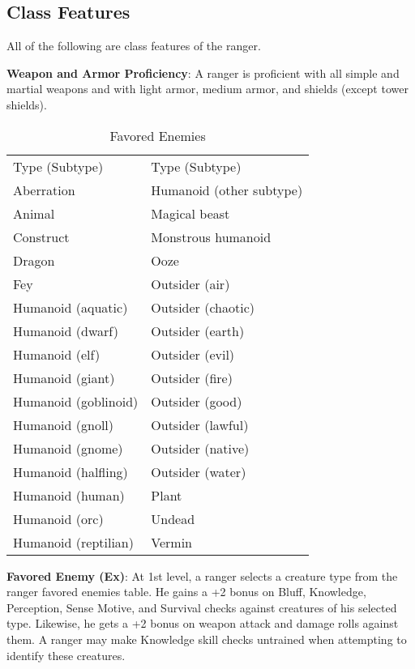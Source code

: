 				
\subsection{Class Features}

				
All of the following are class features of the ranger.
				
\textbf{Weapon and Armor Proficiency}: A ranger is proficient with all simple and martial weapons and with light armor, medium armor, and shields (except tower shields).
\begin{table}[]
\sffamily
\caption{Favored Enemies}
\begin{tabular}{ll}
Type (Subtype)       & Type (Subtype)           \\
Aberration           & Humanoid (other subtype) \\
Animal               & Magical beast            \\
Construct            & Monstrous humanoid       \\
Dragon               & Ooze                     \\
Fey                  & Outsider (air)           \\
Humanoid (aquatic)   & Outsider (chaotic)       \\
Humanoid (dwarf)     & Outsider (earth)         \\
Humanoid (elf)       & Outsider (evil)          \\
Humanoid (giant)     & Outsider (fire)          \\
Humanoid (goblinoid) & Outsider (good)          \\
Humanoid (gnoll)     & Outsider (lawful)        \\
Humanoid (gnome)     & Outsider (native)        \\
Humanoid (halfling)  & Outsider (water)         \\
Humanoid (human)     & Plant                    \\
Humanoid (orc)       & Undead                   \\
Humanoid (reptilian) & Vermin                  
\end{tabular}
\end{table}
\textbf{Favored Enemy (Ex)}: At 1st level, a ranger selects a creature type from the ranger favored enemies table. He gains a +2 bonus on Bluff, Knowledge, Perception, Sense Motive, and Survival checks against creatures of his selected type. Likewise, he gets a +2 bonus on weapon attack and damage rolls against them. A ranger may make Knowledge skill checks untrained when attempting to identify these creatures.
				
